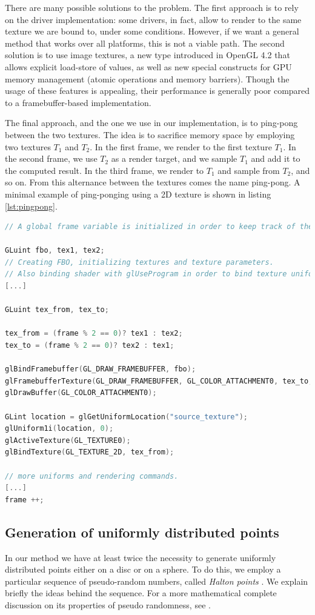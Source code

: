 There are many possible solutions to the problem. The first approach is to rely on the driver implementation: some drivers, in fact, allow to render to the same texture we are bound to, under some conditions. However, if we want a general method that works over all platforms, this is not a viable path. The second solution is to use image textures, a new type introduced in OpenGL 4.2 that allows explicit load-store of values, as well as new special constructs for GPU memory management (atomic operations and memory barriers). Though the usage of these features is appealing, their performance is generally poor compared to a framebuffer-based implementation. 

The final approach, and the one we use in our implementation, is to ping-pong between the two textures. The idea is to sacrifice memory space by employing two textures $T_1$ and $T_2$. In the first frame, we render to the first texture $T_1$. In the second frame, we use $T_2$ as a render target, and we sample $T_1$ and add it to the computed result. In the third frame, we render to $T_1$ and sample from $T_2$, and so on. From this alternance between the textures comes the name ping-pong. A minimal example of ping-ponging using a 2D texture is shown in listing \ref{lst:pingpong}.

\clearpage
\begin{lstlisting}[language=C++,label=lst:pingpong,caption={Minimal example of ping-pong textures.}]
// A global frame variable is initialized in order to keep track of the current frame

GLuint fbo, tex1, tex2;
// Creating FBO, initializing textures and texture parameters.
// Also binding shader with glUseProgram in order to bind texture uniforms
[...]

GLuint tex_from, tex_to;

tex_from = (frame % 2 == 0)? tex1 : tex2;
tex_to = (frame % 2 == 0)? tex2 : tex1;

glBindFramebuffer(GL_DRAW_FRAMEBUFFER, fbo);
glFramebufferTexture(GL_DRAW_FRAMEBUFFER, GL_COLOR_ATTACHMENT0, tex_to, 0);
glDrawBuffer(GL_COLOR_ATTACHMENT0);

GLint location = glGetUniformLocation("source_texture");
glUniform1i(location, 0);
glActiveTexture(GL_TEXTURE0);
glBindTexture(GL_TEXTURE_2D, tex_from);

// more uniforms and rendering commands.
[...]
frame ++;
\end{lstlisting}

\subsection{Generation of uniformly distributed points}
\label{sec:random}
In our method we have at least twice the necessity to generate uniformly distributed points either on a disc or on a sphere. To do this, we employ a particular sequence of pseudo-random numbers, called \emph{Halton points} \citep{Halton:1964:ARQ:355588.365104}. We explain briefly the ideas behind the sequence. For a more mathematical complete discussion on its properties of pseudo randomness, see \cite{niederreiter1992a}. 

